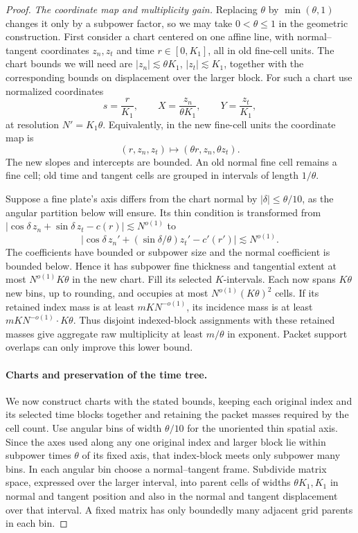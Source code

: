 \begin{proof}
\emph{The coordinate map and multiplicity gain.}
Replacing $\theta$ by $\min(\theta,1)$ changes it only by a
subpower factor, so we may take $0<\theta\le1$ in the geometric
construction.  First consider a chart centered on one affine line, with
normal--tangent coordinates $z_n,z_t$ and time $r\in[0,K_1]$, all
in old fine-cell units.  The chart bounds we will need are
$|z_n|\lesssim\theta K_1$, $|z_t|\lesssim K_1$, together with the
corresponding bounds on displacement over the larger block.
For such a chart use normalized coordinates
\begin{equation}
 s=\frac r{K_1},\qquad
 X=\frac{z_n}{\theta K_1},\qquad
 Y=\frac{z_t}{K_1},
 \label{loc:anisotropic-coordinates}
\end{equation}
at resolution $N'=K_1\theta$.  Equivalently, in the new fine-cell
units the coordinate map is
\begin{equation}
 (r,z_n,z_t)\longmapsto(\theta r,z_n,\theta z_t).
 \label{loc:anisotropic-fine-map}
\end{equation}
The new slopes and intercepts are bounded.  An old normal fine
cell remains a fine cell; old time and tangent cells are grouped
in intervals of length $1/\theta$.

Suppose a fine plate's axis differs from the chart normal by
$|\delta|\le\theta/10$, as the angular partition below will ensure.
Its thin condition is transformed from
$|\cos\delta\,z_n+\sin\delta\,z_t-c(r)|\lesssim N^{o(1)}$
to
\[
 |\cos\delta\,z_n'+(\sin\delta/\theta)z_t'-c'(r')|
       \lesssim N^{o(1)}.
\]
The coefficients have bounded or subpower size and the normal
coefficient is bounded below.  Hence it has subpower fine thickness
and tangential extent at most $N^{o(1)}K\theta$ in the new chart.
Fill its selected $K$-intervals.  Each now spans $K\theta$
new bins, up to rounding, and occupies at most
$N^{o(1)}(K\theta)^2$ cells.  If its retained index mass is at least
$mKN^{-o(1)}$, its incidence mass is at least
$mKN^{-o(1)}\cdot K\theta$.  Thus disjoint indexed-block
assignments with these retained masses
give aggregate raw multiplicity at least $m/\theta$ in exponent.
Packet support overlaps can only improve this lower bound.

\paragraph{Charts and preservation of the time tree.}
We now construct charts with the stated bounds, keeping each
original index and its selected time blocks together and retaining
the packet masses required by the cell count.
Use angular bins of width $\theta/10$ for the unoriented thin spatial
axis.  Since the axes used along any one original index and larger
block lie within subpower times $\theta$ of its fixed axis, that
index-block meets only subpower many bins.  In each angular bin
choose a normal--tangent frame.  Subdivide matrix space, expressed
over the larger interval, into parent cells of widths
$\theta K_1,K_1$ in normal and tangent position and also in the
normal and tangent displacement over that interval.  A fixed
matrix has only boundedly many adjacent grid parents in each bin.


\end{proof}
